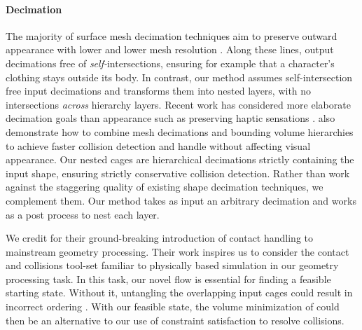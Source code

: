 \paragraph{Decimation}
%
The majority of surface mesh decimation techniques aim to preserve outward
appearance with lower and lower mesh resolution
\cite{Hoppe:1996:PM,Garland:1997:SSU,Melax98}.
%
Along these lines, \cite{gumhold2003intersection} output
decimations free of \emph{self-}intersections, ensuring for example that a
character's clothing stays outside its body.
%
In contrast, our method assumes self-intersection free input decimations and
transforms them into nested layers, with no intersections \emph{across}
hierarchy layers.
%
Recent work has considered more elaborate decimation goals than appearance such
as preserving haptic sensations \cite{Otaduy:2003:SPS}.
%
\cite{Otaduy:2003:CDH} also demonstrate how to combine mesh decimations and bounding
volume hierarchies to achieve faster collision detection and handle without
affecting visual appearance.
%
Our nested cages are hierarchical decimations strictly containing the input
shape, ensuring strictly conservative collision detection.
%
Rather than work against the staggering quality of existing shape decimation
techniques, we complement them. Our method takes as input an arbitrary
decimation and works as a post process to nest each layer.




We credit \cite{ContactAwareModeling:2011} for their
ground-breaking introduction of contact handling to mainstream geometry
processing. Their work inspires us to consider the contact and collisions
tool-set familiar to physically based simulation in our geometry processing
task.
%
In this task, our novel flow is essential for finding a feasible starting
state.
%
Without it, untangling the overlapping input cages could result in incorrect
ordering \cite{Baraff:2003:UC}.
%
%
With our feasible state, the volume minimization of
\cite{ContactAwareModeling:2011} could then be an alternative to our use of
constraint satisfaction to resolve collisions.



